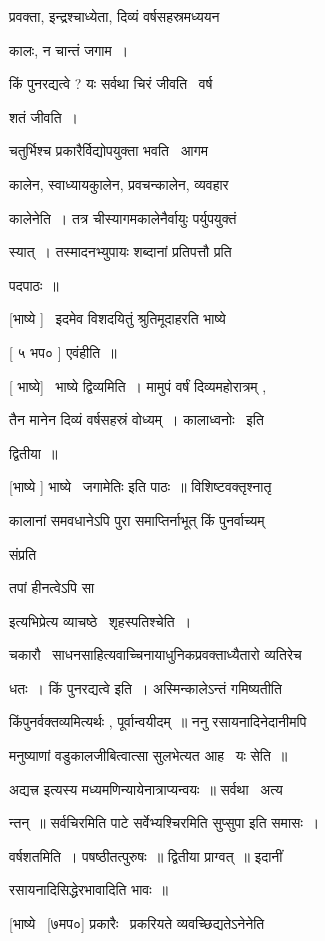 \documentclass[11pt, openany]{book}
\begin{document}
प्रवक्ता, इन्द्रश्चाध्येता, दिव्यं वर्षसहस्रमध्ययन \textendash\ 

कालः, न चान्तं जगाम~। 

किं पुनरद्यत्वे ? यः सर्वथा चिरं जीवति \textendash\ वर्ष \textendash\ 

शतं जीवति~। 

चतुर्भिश्च प्रकारैर्विद्योपयुक्ता भवति \textendash\ आगम \textendash\ 

कालेन, स्वाध्यायकुालेन, प्रवचन्कालेन, व्यवहार \textendash\ 

कालेनेति~। तत्र चीस्यागमकालेनैर्वायुः पर्युपयुक्तं 

स्यात्~। तस्मादनभ्युपायः शब्दानां प्रतिपत्तौ प्रति \textendash\ 

पदपाठः~॥ 

[भाष्ये ] \textendash\ इदमेव विशदयितुं श्रुतिमूदाहरति भाष्ये \textendash\ 

[ ५ भप० ] एवंहीति~॥ 

[ भाष्ये] \textendash\ भाष्ये द्विव्यमिति~। मामुपं वर्षं दिव्यमहोरात्रम् ,

तैन मानेन दिव्यं वर्षसहस्रं वोध्यम्~। {\qt कालाध्वनोः} \textendash\ इति 

द्वितीया~॥ 

[भाष्ये ] भाष्ये \textendash\ {\qt जगामेतिः इति पाठः~॥} विशिष्टवक्तृश्नातृ \textendash\ 

कालानां समवधानेऽपि पुरा समाप्तिर्नाभूत् किं पुनर्वाच्यम् {\qt संप्रति 

तपां हीनत्वेऽपि सा} इत्यभिप्रेत्य व्याचष्ठे \textendash\ शृहस्पतिश्चेति~। 

चकारौ \textendash\ साधनसाहित्यवाच्चिनायाधुनिकप्रवक्ताध्यैतारो व्यतिरेच \textendash\ 

धतः~। किं पुनरद्यत्वे इति~। अस्मिन्कालेऽन्तं गमिष्यतीति 

किंपुनर्वक्तव्यमित्यर्थः , पूर्वान्वयीदम्~॥ ननु रसायनादिनेदानीमपि 

मनुष्याणां वडुकालजीबित्वात्सा सुलभेत्यत आह \textendash\ यः सेति~॥ 

अद्यत्त्र इत्यस्य मध्यमणिन्यायेनात्राप्यन्वयः~॥ सर्वथा \textendash\ अत्य \textendash\ 

न्तन्~॥ सर्वचिरमिति पाटे सर्वेभ्यश्चिरमिति {\qt सुप्सुपा} इति समासः~। 

वर्षशतमिति~। पषष्ठीतत्पुरुषः~॥ द्वितीया प्राग्वत्~॥ इदानीं 

रसायनादिसिद्धेरभावादिति भावः~॥ 

[भाष्ये \textendash\ [७मप०] प्रकारैः \textendash\ प्रकरियते व्यवच्छिद्यतेऽनेनेति \textendash\ 
\end{document}
